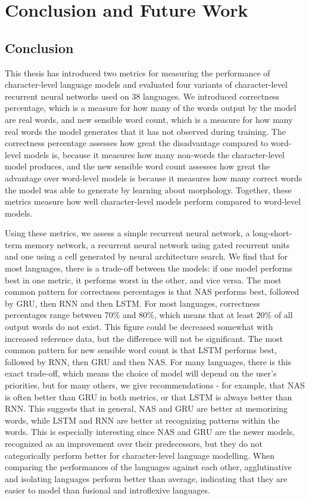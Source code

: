 \documentclass[11pt,a4paper,twoside,openright]{scrbook}
\begin{document}
\chapter{Conclusion and Future Work}
\section{Conclusion}
This thesis has introduced two metrics for measuring the performance of character-level language models and evaluated four variants of character-level recurrent neural networks used on 38 languages. We introduced correctness percentage, which is a measure for how many of the words output by the model are real words, and new sensible word count, which is a measure for how many real words the model generates that it has not observed during training. The correctness percentage assesses how great the disadvantage compared to word-level models is, because it measures how many non-words the character-level model produces, and the new sensible word count assesses how great the advantage over word-level models is because it measures how many correct words the model was able to generate by learning about morphology. Together, these metrics measure how well character-level models perform compared to word-level models. 

Using these metrics, we assess a simple recurrent neural network, a long-short-term memory network, a recurrent neural network using gated recurrent units and one using a cell generated by neural architecture search. We find that for most languages, there is a trade-off between the models: if one model performs best in one metric, it performs worst in the other, and vice versa. The most common pattern for correctness percentages is that NAS performs best, followed by GRU, then RNN and then LSTM. For most languages, correctness percentages range between 70\% and 80\%, which means that at least 20\% of all output words do not exist. This figure could be decreased somewhat with increased reference data, but the difference will not be significant. The most common pattern for new sensible word count is that LSTM performs best, followed by RNN, then GRU and then NAS. For many languages, there is this exact trade-off, which means the choice of model will depend on the user’s priorities, but for many others, we give recommendations  - for example, that NAS is often better than GRU in both metrics, or that LSTM is always better than RNN. This suggests that in general, NAS and GRU are better at memorizing words, while LSTM and RNN are better at recognizing patterns within the words. This is especially interesting since NAS and GRU are the newer models, recognized as an improvement over their predecessors, but they do not categorically perform better for character-level language modelling. When comparing the performances of the languages against each other, agglutinative and isolating languages perform better than average, indicating that they are easier to model than fusional and introflexive languages. 
\end{document}
